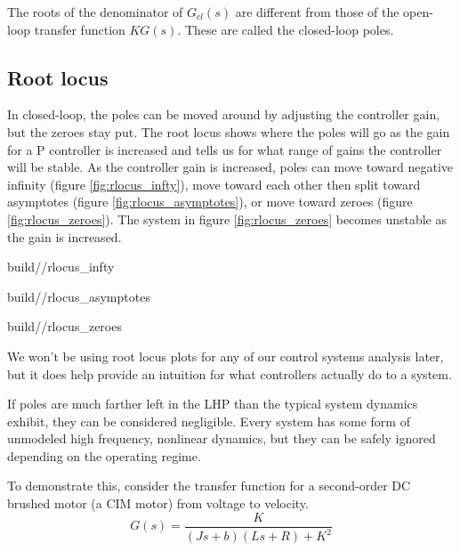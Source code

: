 The roots of the denominator of $G_{cl}(s)$ are different from those of the
open-loop transfer function $KG(s)$. These are called the closed-loop poles.

\subsection{Root locus}
\label{subsec:root_locus}

In closed-loop, the poles can be moved around by adjusting the controller gain,
but the zeroes stay put. The root locus shows where the poles will go as the
gain for a P controller is increased and tells us for what range of gains the
controller will be stable. As the controller gain is increased, poles can move
toward negative infinity (figure \ref{fig:rlocus_infty}), move toward each other
then split toward asymptotes (figure \ref{fig:rlocus_asymptotes}), or move
toward zeroes (figure \ref{fig:rlocus_zeroes}). The \gls{system} in figure
\ref{fig:rlocus_zeroes} becomes unstable as the gain is increased.
\begin{bookfigure}
  \begin{minisvg}{2}{build/\chapterpath/rlocus_infty}
    \caption{Root locus showing pole moving toward negative infinity}
    \label{fig:rlocus_infty}
  \end{minisvg}
  \hfill
  \begin{minisvg}{2}{build/\chapterpath/rlocus_asymptotes}
    \caption{Root locus showing poles moving toward asymptotes}
    \label{fig:rlocus_asymptotes}
  \end{minisvg}
  \hfill
  \begin{minisvg}{2}{build/\chapterpath/rlocus_zeroes}
    \caption{Root locus of equation \eqref{eq:transfer_func} showing poles
      moving toward zeroes.}
    \label{fig:rlocus_zeroes}
  \end{minisvg}
\end{bookfigure}

We won't be using root locus plots for any of our control systems analysis
later, but it does help provide an intuition for what \glspl{controller}
actually do to a \gls{system}.

If poles are much farther left in the LHP than the typical \gls{system} dynamics
exhibit, they can be considered negligible. Every \gls{system} has some form of
unmodeled high frequency, nonlinear dynamics, but they can be safely ignored
depending on the operating regime.

To demonstrate this, consider the transfer function for a second-order DC
brushed motor (a CIM motor) from voltage to velocity.
\begin{equation*}
  G(s) = \frac{K}{(Js + b)(Ls + R) + K^2}
\end{equation*}

